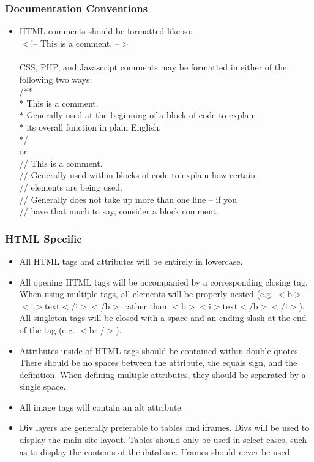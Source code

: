 		\subsubsection{Documentation Conventions}
		\begin{itemize}
			\item HTML comments should be formatted like so:\\$<$!-- This is a comment. --$>$\\
			\\CSS, PHP, and Javascript comments may be formatted in either of the following two ways:\\/**\\  $*$ This is a comment. \\ $*$ Generally used at the beginning of a block of code to explain\\ $*$ its overall function in plain English.\\ $*$/\\or\\// This is a comment. \\ // Generally used within blocks of code to explain how certain\\// elements are being used. \\// Generally does not take up more than one line -- if you\\// have that much to say, consider a block comment.
		\end{itemize}
			
		\subsubsection{HTML Specific}
		\begin{itemize}
			\item All HTML tags and attributes will be entirely in lowercase.
			\item All opening HTML tags will be accompanied by a corresponding closing tag. When using multiple tags, all elements will be properly nested (e.g. $<$b$>$$<$i$>$text$<$/i$>$$<$/b$>$ rather than $<$b$>$$<$i$>$text$<$/b$>$$<$/i$>$). All singleton tags will be closed with a space and an ending slash at the end of the tag (e.g. $<$br /$>$).
			\item Attributes inside of HTML tags should be contained within double quotes. There should be no spaces between the attribute, the equals sign, and the definition. When defining multiple attributes, they should be separated by a single space.
			\item All image tags will contain an alt attribute.
			\item Div layers are generally preferable to tables and iframes. Divs will be used to display the main site layout. Tables should only be used in select cases, such as to display the contents of the database. Iframes should never be used.
		\end{itemize}
			
